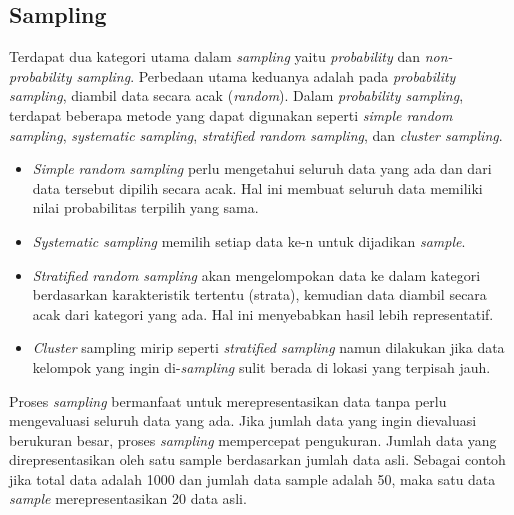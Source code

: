 \subsection{Sampling}
Terdapat dua kategori utama dalam \textit{sampling} yaitu \textit{probability} dan \textit{non-probability sampling}. Perbedaan utama keduanya adalah pada \textit{probability sampling}, diambil data secara acak (\textit{random}). Dalam \textit{probability sampling}, terdapat beberapa metode yang dapat digunakan seperti \textit{simple random sampling}, \textit{systematic sampling}, \textit{stratified random sampling}, dan \textit{cluster sampling}.
\begin{itemize}
  \item \textit{Simple random sampling} perlu mengetahui seluruh data yang ada dan dari data tersebut dipilih secara acak. Hal ini membuat seluruh data memiliki nilai probabilitas terpilih yang sama. 
  \item \textit{Systematic sampling} memilih setiap data ke-n untuk dijadikan \textit{sample}. 
  \item \textit{Stratified random sampling} akan mengelompokan data ke dalam kategori berdasarkan karakteristik tertentu (strata), kemudian data diambil secara acak dari kategori yang ada. Hal ini menyebabkan hasil lebih representatif. 
  \item \textit{Cluster} sampling mirip seperti \textit{stratified sampling} namun dilakukan jika data kelompok yang ingin di-\textit{sampling} sulit berada di lokasi yang terpisah jauh.
\end{itemize}
Proses \textit{sampling} bermanfaat untuk merepresentasikan data tanpa perlu mengevaluasi seluruh data yang ada. Jika jumlah data yang ingin dievaluasi berukuran besar, proses \textit{sampling} mempercepat pengukuran. Jumlah data yang direpresentasikan oleh satu sample berdasarkan jumlah data asli. Sebagai contoh jika total data adalah 1000 dan jumlah data sample adalah 50, maka satu data \textit{sample} merepresentasikan 20 data asli.

